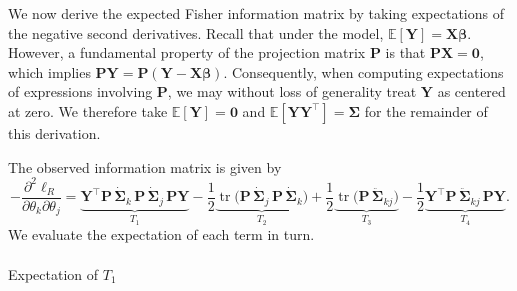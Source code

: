 \documentclass[
  letterpaper,
  DIV=11,
  numbers=noendperiod]{scrartcl}
\makeatletter
\let\oldparagraph\paragraph
\renewcommand{\paragraph}{
    \@ifstar
      \xxxParagraphStar
      \xxxParagraphNoStar
  }
\newcommand{\xxxParagraphStar}[1]{\oldparagraph*{#1}\mbox{}}
\newcommand{\xxxParagraphNoStar}[1]{\oldparagraph{#1}\mbox{}}
\makeatother
\begin{document}
We now derive the expected Fisher information matrix by taking
expectations of the negative second derivatives. Recall that under the
model, \(\mathbb{E}[\symbf{Y}] = \symbf{X}\symbf{\beta}\). However, a
fundamental property of the projection matrix \(\symbf{P}\) is that
\(\symbf{P}\symbf{X} = \symbf{0}\), which implies
\(\symbf{P}\symbf{Y} = \symbf{P}(\symbf{Y} - \symbf{X}\symbf{\beta})\).
Consequently, when computing expectations of expressions involving
\(\symbf{P}\), we may without loss of generality treat \(\symbf{Y}\) as
centered at zero. We therefore take
\(\mathbb{E}[\symbf{Y}] = \symbf{0}\) and
\(\mathbb{E}[\symbf{Y}\symbf{Y}^\top] = \symbf{\Sigma}\) for the
remainder of this derivation.

The observed information matrix is given by \begin{equation}
-\frac{\partial^2 \ell_R}{\partial \theta_k \partial \theta_j}
=
\underbrace{\symbf{Y}^\top \symbf{P}\,\dot{\symbf{\Sigma}}_k\,\symbf{P}\,\dot{\symbf{\Sigma}}_j\,\symbf{P} \symbf{Y}}_{T_1}
-\frac12 \underbrace{\operatorname{tr}\!\big( \symbf{P}\,\dot{\symbf{\Sigma}}_j\,\symbf{P}\,\dot{\symbf{\Sigma}}_k \big)}_{T_2}
+\frac12 \underbrace{\operatorname{tr}\!\big( \symbf{P}\,\ddot{\symbf{\Sigma}}_{kj} \big)}_{T_3}
- \frac12 \underbrace{\symbf{Y}^\top \symbf{P}\,\ddot{\symbf{\Sigma}}_{kj}\,\symbf{P}\symbf{Y}}_{T_4}.
\end{equation} We evaluate the expectation of each term in turn.

\paragraph{\texorpdfstring{Expectation of
\(T_1\)}{Expectation of T\_1}}\label{expectation-of-t_1}
\end{document}
